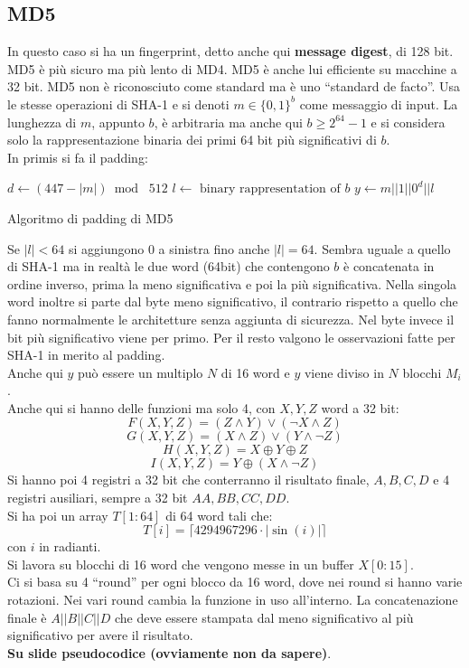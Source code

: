 \documentclass[a4paper,12pt, oneside]{book}
\begin{document}
\subsection{MD5}
In questo caso si ha un fingerprint, detto anche qui \textbf{message digest}, di
128 bit. MD5 è più sicuro ma più lento di MD4. MD5 è anche lui efficiente su
macchine a 32 bit. MD5 non è riconosciuto come standard ma è uno ``standard de
facto''. Usa le stesse operazioni di SHA-1 e si denoti $m\in\{0,1\}^b$ come
messaggio di input. La lunghezza di $m$, appunto $b$, è arbitraria ma anche qui
$b\geq 2^{64}-1$ e si considera solo la rappresentazione binaria dei primi 64
bit più significativi di $b$.\\
In primis si fa il padding:
\begin{algorithm}[H]
  \begin{algorithmic}
    \State $d\gets (447-|m|)\bmod\,\,512$
    \State $l\gets\mbox{ binary rappresentation of }b$
    \State $y\gets m||1||0^d||l$
    \EndFunction
  \end{algorithmic}
  \caption{Algoritmo di padding di MD5}
\end{algorithm}
Se $|l|<64$ si aggiungono 0 a sinistra fino anche $|l|=64$. Sembra uguale a
quello di SHA-1 ma in realtà le due word (64bit) che contengono $b$ è
concatenata in ordine inverso, prima la meno significativa e poi la più
significativa. Nella singola word inoltre si parte dal byte meno significativo,
il contrario rispetto a quello che fanno normalmente le architetture senza
aggiunta di sicurezza. Nel byte invece il bit più significativo viene per
primo. Per il resto valgono le osservazioni fatte per SHA-1 in merito al
padding.\\
Anche qui $y$ può essere un multiplo $N$ di 16 word e $y$ viene diviso in $N$
blocchi $M_i$.\\
Anche qui si hanno delle funzioni ma solo 4, con $X,Y,Z$ word a 32 bit:
\[F(X,Y,Z)=(Z\land Y)\lor (\neg X\land Z)\]
\[G(X,Y,Z)=(X\land Z)\lor (Y\land\neg  Z)\]
\[H(X,Y,Z)=X\oplus Y\oplus Z\]
\[I(X,Y,Z)=Y\oplus (X\land\neg  Z)\]
Si hanno poi 4 registri a 32 bit che conterranno il risultato finale, $A,B,C,D$
e 4 registri ausiliari, sempre a 32 bit $AA,BB,CC,DD$.\\
Si ha poi un array $T[1:64]$ di 64 word tali che:
\[T[i]=\lceil 4294967296\cdot |\sin(i)|\rceil\]
con $i$ in radianti.\\
Si lavora su blocchi di 16 word che vengono messe in un buffer $X[0:15]$.\\
Ci si basa su 4 ``round'' per ogni blocco da 16 word, dove nei round si hanno
varie rotazioni. Nei vari round cambia la funzione in uso all'interno. La
concatenazione finale è $A||B||C||D$ che deve essere stampata dal meno
significativo al più significativo per avere il risultato.\\
\textbf{Su slide pseudocodice (ovviamente non da sapere)}.
\end{document}
